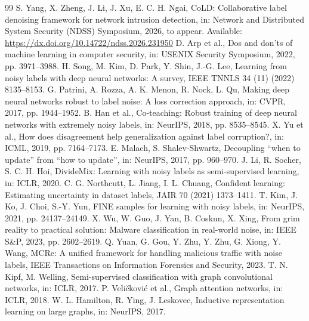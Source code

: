 \documentclass[preprint,3p,times]{elsarticle}
\begin{document}
\begin{thebibliography}{99}
 S. Yang, X. Zheng, J. Li, J. Xu, E. C. H. Ngai,
CoLD: Collaborative label denoising framework for network intrusion detection,
in: Network and Distributed System Security (NDSS) Symposium, 2026,
to appear. Available: \url{https://dx.doi.org/10.14722/ndss.2026.231950}
 D. Arp et al., Dos and don'ts of machine learning in
computer security, in: USENIX Security Symposium, 2022, pp. 3971--3988.
 H. Song, M. Kim, D. Park, Y. Shin, J.-G. Lee,
Learning from noisy labels with deep neural networks: A survey,
IEEE TNNLS 34 (11) (2022) 8135--8153.
 G. Patrini, A. Rozza, A. K. Menon, R. Nock, L. Qu,
Making deep neural networks robust to label noise: A loss correction approach,
in: CVPR, 2017, pp. 1944--1952.
 B. Han et al., Co-teaching: Robust training of deep
neural networks with extremely noisy labels, in: NeurIPS, 2018, pp. 8535--8545.
 X. Yu et al., How does disagreement help
generalization against label corruption?, in: ICML, 2019, pp. 7164--7173.
 E. Malach, S. Shalev-Shwartz, Decoupling ``when to
update'' from ``how to update'', in: NeurIPS, 2017, pp. 960--970.
 J. Li, R. Socher, S. C. H. Hoi, DivideMix: Learning with
noisy labels as semi-supervised learning, in: ICLR, 2020.
 C. G. Northcutt, L. Jiang, I. L. Chuang,
Confident learning: Estimating uncertainty in dataset labels,
JAIR 70 (2021) 1373--1411.
 T. Kim, J. Ko, J. Choi, S.-Y. Yun, FINE samples for learning
with noisy labels, in: NeurIPS, 2021, pp. 24137--24149.
 X. Wu, W. Guo, J. Yan, B. Coskun, X. Xing, From grim reality
to practical solution: Malware classification in real-world noise, in: IEEE S\&P,
2023, pp. 2602--2619.
 Q. Yuan, G. Gou, Y. Zhu, Y. Zhu, G. Xiong, Y. Wang,
MCRe: A unified framework for handling malicious traffic with noise labels,
IEEE Transactions on Information Forensics and Security, 2023.
 T. N. Kipf, M. Welling, Semi-supervised classification with
graph convolutional networks, in: ICLR, 2017.
 P. Veli\v{c}kovi\'c et al., Graph attention networks,
in: ICLR, 2018.
 W. L. Hamilton, R. Ying, J. Leskovec, Inductive
representation learning on large graphs, in: NeurIPS, 2017.

\end{thebibliography}
\end{document}
